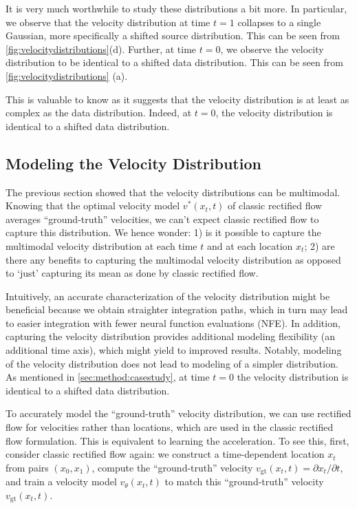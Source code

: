 It is very much worthwhile to study these distributions a bit more. In particular, we observe that the velocity distribution at time $t=1$ collapses to a single Gaussian, more specifically a shifted source distribution. This can be seen from \cref{fig:velocitydistributions}(d). Further, at time $t=0$, we observe the velocity distribution to be identical to a shifted data distribution. This can be seen from \cref{fig:velocitydistributions} (a). %

This is valuable to know as it suggests that the velocity distribution is at least as complex as the data distribution. Indeed, at $t=0$, the velocity distribution is identical to a shifted data distribution.


\subsection{Modeling the Velocity Distribution}
\label{sec:method:approach}
The previous section showed that the velocity distributions can be multimodal. Knowing that the optimal velocity model $v^\ast(x_t,t)$ of classic rectified flow averages ``ground-truth'' velocities, we can't expect classic rectified flow to capture this distribution. We hence wonder: 1) is it possible to capture the multimodal velocity distribution at each time $t$ and at each location $x_t$; 2) are there any benefits to capturing the multimodal velocity distribution as opposed to `just' capturing its mean as done by classic rectified flow.

Intuitively, an accurate characterization of the velocity distribution might be beneficial because we obtain straighter integration paths, which in turn may lead to easier integration with fewer neural function evaluations (NFE). In addition, capturing the velocity distribution provides additional modeling flexibility (an additional time axis), which might yield to improved results. Notably, modeling of the velocity distribution does not lead to modeling of a simpler distribution. As mentioned in \cref{sec:method:casestudy}, at time $t=0$ the velocity distribution is identical to a shifted data distribution. %

To accurately model the ``ground-truth'' velocity distribution, we can  use rectified flow for velocities rather than locations, which are used in the classic rectified flow formulation. This is equivalent to learning the acceleration. To see this, first, consider classic rectified flow again: we construct a time-dependent location $x_t$ from pairs $(x_0,x_1)$, compute the ``ground-truth'' velocity $v_{\mathrm{gt}}(x_t,t) = \partial x_t/\partial t$, and train a velocity model $v_\theta(x_t,t)$ to match this ``ground-truth'' velocity $v_\mathrm{gt}(x_t,t)$.

